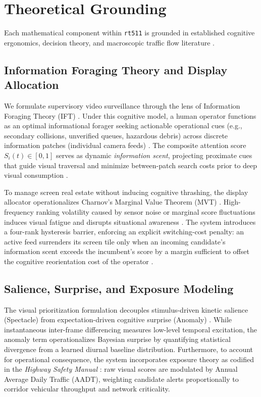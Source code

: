 \documentclass[10pt,journal,compsoc]{IEEEtran}
\begin{document}
\section{Theoretical Grounding}
Each mathematical component within \texttt{rt511} is grounded in established cognitive ergonomics, decision theory, and macroscopic traffic flow literature \cite{charnov1976, fishburn1974, lighthill1955, pirolli1999}.

\subsection{Information Foraging Theory and Display Allocation}
We formulate supervisory video surveillance through the lens of Information Foraging Theory (IFT) \cite{pirolli1999}. Under this cognitive model, a human operator functions as an optimal informational forager seeking actionable operational cues (e.g., secondary collisions, unverified queues, hazardous debris) across discrete information patches (individual camera feeds) \cite{pirolli1999}. The composite attention score $S_i(t) \in [0, 1]$ serves as dynamic \textit{information scent}, projecting proximate cues that guide visual traversal and minimize between-patch search costs prior to deep visual consumption \cite{pirolli1999}.

To manage screen real estate without inducing cognitive thrashing, the display allocator operationalizes Charnov's Marginal Value Theorem (MVT) \cite{charnov1976}. High-frequency ranking volatility caused by sensor noise or marginal score fluctuations induces visual fatigue and disrupts situational awareness \cite{charnov1976}. The system introduces a four-rank hysteresis barrier, enforcing an explicit switching-cost penalty: an active feed surrenders its screen tile only when an incoming candidate's information scent exceeds the incumbent's score by a margin sufficient to offset the cognitive reorientation cost of the operator \cite{charnov1976, pirolli1999}.

\subsection{Salience, Surprise, and Exposure Modeling}

The visual prioritization formulation decouples stimulus-driven kinetic salience (Spectacle) from expectation-driven cognitive surprise (Anomaly) \cite{itti1998, itti2009}. While instantaneous inter-frame differencing measures low-level temporal excitation, the anomaly term operationalizes Bayesian surprise \cite{itti2009} by quantifying statistical divergence from a learned diurnal baseline distribution. Furthermore, to account for operational consequence, the system incorporates exposure theory as codified in the \textit{Highway Safety Manual} \cite{aashto2010}: raw visual scores are modulated by Annual Average Daily Traffic (AADT), weighting candidate alerts proportionally to corridor vehicular throughput and network criticality.
\end{document}
